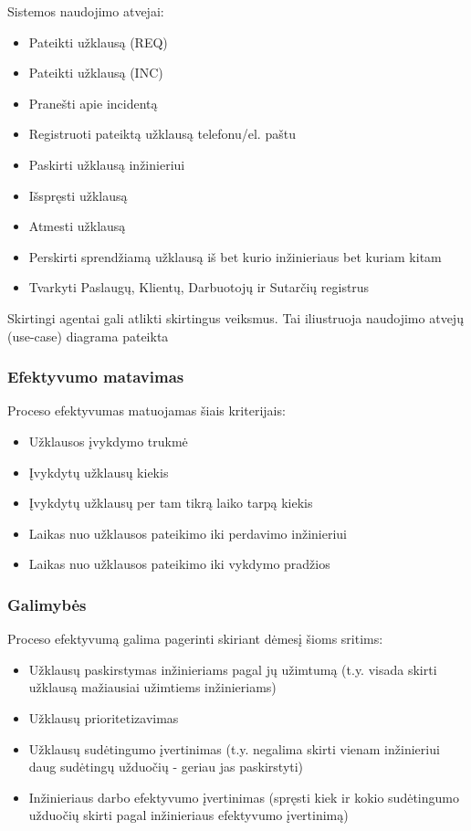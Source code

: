 			Sistemos naudojimo atvejai:
			\begin{itemize}
				\item Pateikti užklausą (REQ)
				\item Pateikti užklausą (INC)
				\item Pranešti apie incidentą
				\item Registruoti pateiktą užklausą telefonu/el. paštu
				\item Paskirti užklausą inžinieriui
				\item Išspręsti užklausą
				\item Atmesti užklausą
				\item Perskirti sprendžiamą užklausą iš bet kurio inžinieriaus bet kuriam kitam
				\item Tvarkyti Paslaugų, Klientų, Darbuotojų ir Sutarčių registrus
			\end{itemize}
			
			Skirtingi agentai gali atlikti skirtingus veiksmus.
			Tai iliustruoja naudojimo atvejų (use-case) diagrama pateikta 


		\subsubsection{Efektyvumo matavimas}
		
			Proceso efektyvumas matuojamas šiais kriterijais:
			\begin{itemize}
				\item Užklausos įvykdymo trukmė
				\item Įvykdytų užklausų kiekis
				\item Įvykdytų užklausų per tam tikrą laiko tarpą kiekis
				\item Laikas nuo užklausos pateikimo iki perdavimo inžinieriui
				\item Laikas nuo užklausos pateikimo iki vykdymo pradžios 
			\end{itemize}
			
		\subsubsection{Galimybės}

			Proceso efektyvumą galima pagerinti skiriant dėmesį šioms sritims:
			\begin{itemize}
				\item Užklausų paskirstymas inžinieriams pagal jų užimtumą
				(t.y. visada skirti užklausą mažiausiai užimtiems inžinieriams)
				\item Užklausų prioritetizavimas
				\item Užklausų sudėtingumo įvertinimas
				(t.y. negalima skirti vienam inžinieriui daug sudėtingų užduočių - geriau jas paskirstyti)
				\item Inžinieriaus darbo efektyvumo įvertinimas
				(spręsti kiek ir kokio sudėtingumo užduočių skirti pagal inžinieriaus efektyvumo įvertinimą)
			\end{itemize}


